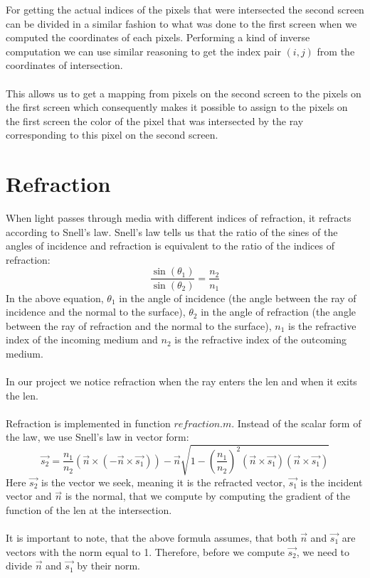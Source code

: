 \documentclass[A4]{article}
\begin{document}
For getting the actual indices of the pixels that were intersected the second screen can be divided in a similar fashion to what was done to the first screen when we computed the coordinates of each pixels. Performing a kind of inverse computation we can use similar reasoning to get the index pair $(i, j)$ from the coordinates of intersection. \\\\
This allows us to get a mapping from pixels on the second screen to the pixels on the first screen which consequently makes it possible to assign to the pixels on the first screen the color of the pixel that was intersected by the ray corresponding to this pixel on the second screen. \\

\section{Refraction}
When light passes through media with different indices of refraction, it refracts according to Snell's law. Snell's law tells us that the ratio of the sines of the angles of incidence and refraction is equivalent to the ratio of the indices of refraction:
\[
	\dfrac{\sin(\theta_1)}{\sin(\theta_2)} = \dfrac{n_2}{n_1}
\]
In the above equation, $\theta_1$ in the angle of incidence (the angle between the ray of incidence and the normal to the surface), $\theta_2$ in the angle of refraction (the angle between the ray of refraction and the normal to the surface), $n_1$ is the refractive index of the incoming medium and $n_2$ is the refractive index of the outcoming medium. \\ \\
In our project we notice refraction when the ray enters the len and when it exits the len. \\ \\
Refraction is implemented in function $refraction.m$. Instead of the scalar form of the law, we use Snell's law in vector form:
\[
	\vec{s_2} = \dfrac{n_1}{n_2}(\vec{n}\times(-\vec{n}\times\vec{s_1})) - \vec{n}\sqrt{1-(\dfrac{n_1}{n_2})^2(\vec{n}\times\vec{s_1})(\vec{n}\times		\vec{s_1})}
\]
Here $\vec{s_2}$ is the vector we seek, meaning it is the refracted vector, $\vec{s_1}$ is the incident vector and $\vec{n}$ is the normal, that we compute by computing the gradient of the function of the len at the intersection. \\ \\
It is important to note, that the above formula assumes, that both $\vec{n}$ and $\vec{s_1}$ are vectors with the norm equal to 1. Therefore, before we compute $\vec{s_2}$, we need to divide $\vec{n}$ and $\vec{s_1}$ by their norm. \\\\
\end{document}
